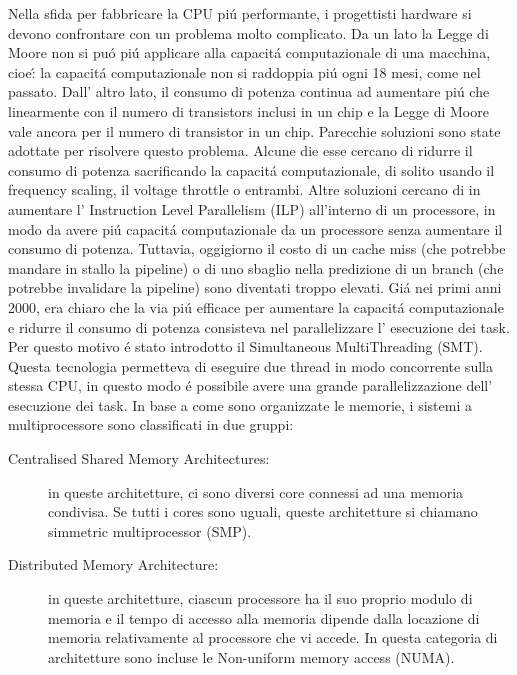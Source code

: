 Nella sfida per fabbricare la CPU pi\'u performante, i progettisti hardware si devono confrontare con un problema molto complicato. Da un lato la Legge 
di Moore non si pu\'o pi\'u applicare alla capacit\'a computazionale di una macchina, cioe\': la capacit\'a computazionale non si raddoppia pi\'u ogni 18 
mesi, come nel passato. Dall' altro lato, il consumo di potenza continua ad aumentare pi\'u che linearmente con il numero di transistors inclusi in un chip 
e la Legge di Moore vale ancora per il numero di transistor in un chip. Parecchie soluzioni sono state adottate per risolvere questo problema. Alcune die 
esse cercano di ridurre il consumo di potenza sacrificando la capacit\'a computazionale, di solito usando il frequency scaling, il voltage throttle o 
entrambi. Altre soluzioni cercano di in aumentare l' Instruction Level Parallelism (ILP) all'interno di un processore, in modo da avere pi\'u capacit\'a 
computazionale da un processore senza aumentare il consumo di potenza. Tuttavia, oggigiorno il costo di un cache miss (che potrebbe mandare in stallo la 
pipeline) o di uno sbaglio nella predizione di un branch (che potrebbe invalidare la pipeline) sono diventati troppo elevati. Gi\'a nei primi anni 2000, era
chiaro che la via pi\'u efficace per aumentare la capacit\'a computazionale e ridurre il consumo di potenza consisteva nel parallelizzare l' esecuzione dei
task. Per questo motivo \'e stato introdotto il Simultaneous MultiThreading (SMT). Questa tecnologia permetteva di eseguire due thread in modo concorrente 
sulla stessa CPU, in questo modo \'e possibile avere una grande parallelizzazione dell' esecuzione dei task. In base a come sono organizzate le memorie, i
sistemi a multiprocessore sono classificati in due gruppi:

\begin{description}

\item [Centralised Shared Memory Architectures:] in queste architetture, ci sono diversi core connessi ad una memoria condivisa. Se tutti i cores 
sono uguali, queste architetture si chiamano simmetric multiprocessor (SMP).

\item [Distributed Memory Architecture:] in queste architetture, ciascun processore ha il suo proprio modulo di memoria e il tempo di accesso alla memoria 
dipende dalla locazione di memoria relativamente al processore che vi accede. In questa categoria di architetture sono incluse le Non-uniform memory access 
(NUMA).

\end{description}

